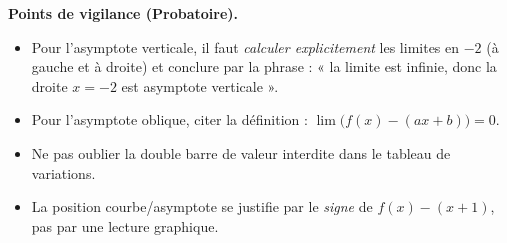 \documentclass[11pt]{article}
\begin{document}
\begin{corrige}
\textbf{Points de vigilance (Probatoire).}
\begin{itemize}
\item Pour l'asymptote verticale, il faut \emph{calculer explicitement} les limites en $-2$ (à gauche et à droite) et conclure par la phrase : « la limite est infinie, donc la droite $x=-2$ est asymptote verticale ».
\item Pour l'asymptote oblique, citer la définition : $\lim\bigl(f(x)-(ax+b)\bigr)=0$.
\item Ne pas oublier la double barre de valeur interdite dans le tableau de variations.
\item La position courbe/asymptote se justifie par le \emph{signe} de $f(x)-(x+1)$, pas par une lecture graphique.
\end{itemize}
\end{corrige}
\end{document}
